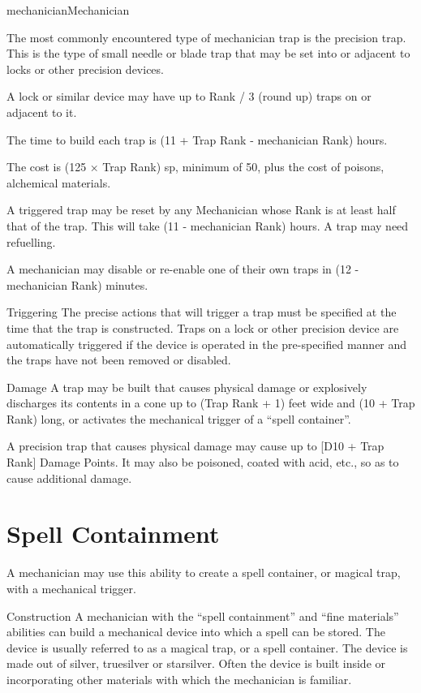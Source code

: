 \begin{Skill}[2.2]{mechanician}{Mechanician}
\begin{Description}
The most commonly encountered type of mechanician trap is the
precision trap.  This is the type of small needle or blade trap that
may be set into or adjacent to locks or other precision devices.

A lock or similar device may have up to Rank / 3 (round up) traps on
or adjacent to it.

The time to build each trap is (11 + Trap Rank - mechanician Rank)
hours.

The cost is (125 × Trap Rank) sp, minimum of 50, plus the cost of
poisons, alchemical materials.

A triggered trap may be reset by any Mechanician whose Rank is at
least half that of the trap.  This will take (11 - mechanician Rank)
hours.  A trap may need refuelling.

A mechanician may disable or re-enable one of their own traps in (12 -
mechanician Rank) minutes.

\item[Triggering] The precise actions that will trigger a trap must be
  specified at the time that the trap is constructed.  Traps on a lock
  or other precision device are automatically triggered if the device
  is operated in the pre-specified manner and the traps have not been
  removed or disabled.

\item[Damage] A trap may be built that causes physical damage or
  explosively discharges its contents in a cone up to (Trap Rank + 1)
  feet wide and (10 + Trap Rank) long, or activates the mechanical
  trigger of a “spell container”.

  A precision trap that causes physical damage may cause up to [D10 +
    Trap Rank] Damage Points.  It may also be poisoned, coated with
  acid, etc., so as to cause additional damage.

\end{Description}

\section{Spell Containment}

A mechanician may use this ability to create a spell container, or
magical trap, with a mechanical trigger.

\begin{Description}

\item[Construction] A mechanician with the “spell containment” and
  “fine materials” abilities can build a mechanical device into which
  a spell can be stored.  The device is usually referred to as a
  magical trap, or a spell container.  The device is made out of
  silver, truesilver or starsilver.  Often the device is built inside
  or incorporating other materials with which the mechanician is
  familiar.


\end{Description}
\end{Skill}
